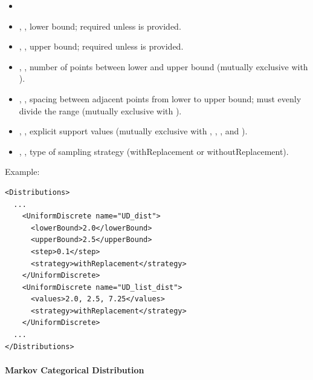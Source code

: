 %
\attrIntro
\vspace{-5mm}
\begin{itemize}
  \itemsep0em
  \item \nameDescription
\end{itemize}
\vspace{-5mm}
\subnodeIntro
\begin{itemize}
  \item {}, , lower bound; required unless  is provided.
  \item {}, , upper bound; required unless  is provided.
  \item {},    , number of points between lower and upper bound (mutually exclusive with ).
  \item {},       , spacing between adjacent points from lower to upper bound; must evenly divide the range (mutually exclusive with ).
  \item {},     , explicit support values (mutually exclusive with , , , and ).
  \item {},   , type of sampling strategy
  (withReplacement or withoutReplacement).
\end{itemize}

Example:
\begin{lstlisting}[style=XML]
<Distributions>
  ...
    <UniformDiscrete name="UD_dist">
      <lowerBound>2.0</lowerBound>
      <upperBound>2.5</upperBound>
      <step>0.1</step>
      <strategy>withReplacement</strategy>
    </UniformDiscrete>
    <UniformDiscrete name="UD_list_dist">
      <values>2.0, 2.5, 7.25</values>
      <strategy>withReplacement</strategy>
    </UniformDiscrete>
  ...
</Distributions>
\end{lstlisting}

\paragraph{Markov Categorical Distribution}
\label{subsec:markovCategorical}

